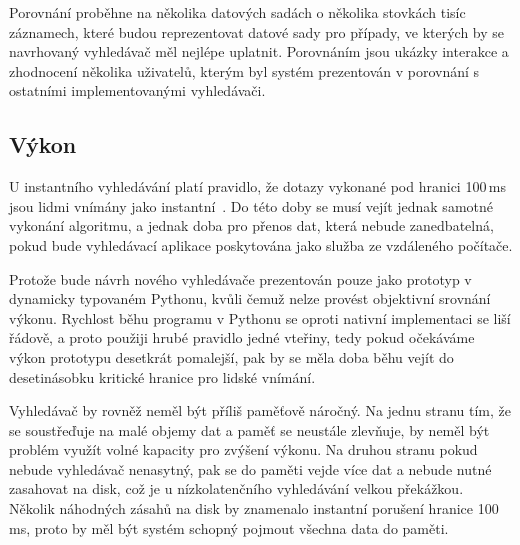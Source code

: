 \documentclass[11pt,letterpaper,oneside,openright]{book}
\begin{document}
Porovnání proběhne na několika datových sadách o několika stovkách tisíc
záznamech, které budou reprezentovat datové sady pro případy, ve kterých by se
navrhovaný vyhledávač měl nejlépe uplatnit. Porovnáním jsou ukázky interakce a
zhodnocení několika uživatelů, kterým byl systém prezentován v porovnání s
ostatními implementovanými vyhledávači.

\subsection{Výkon}
U instantního vyhledávání platí pravidlo, že dotazy vykonané pod hranici
100\,ms jsou lidmi vnímány jako instantní~\cite{sto_ms}. Do této doby se musí
vejít jednak samotné vykonání algoritmu, a jednak doba pro přenos dat, která
nebude zanedbatelná, pokud bude vyhledávací aplikace poskytována jako služba ze
vzdáleného počítače.

Protože bude návrh nového vyhledávače prezentován pouze jako prototyp v
dynamicky typovaném Pythonu, kvůli čemuž nelze provést objektivní srovnání
výkonu. Rychlost běhu programu v Pythonu se oproti nativní implementaci se liší
řádově, a proto použiji hrubé pravidlo jedné vteřiny, tedy pokud očekáváme
výkon prototypu desetkrát pomalejší, pak by se měla doba běhu vejít do
desetinásobku kritické hranice pro lidské vnímání.

Vyhledávač by rovněž neměl být příliš paměťově náročný. Na jednu stranu tím, že
se soustřeďuje na malé objemy dat a paměť se neustále zlevňuje, by neměl být
problém využít volné kapacity pro zvýšení výkonu. Na druhou stranu pokud nebude
vyhledávač nenasytný, pak se do paměti vejde více dat a nebude nutné zasahovat
na disk, což je u nízkolatenčního vyhledávání velkou překážkou. Několik
náhodných zásahů na disk by znamenalo instantní porušení hranice 100\,ms, proto
by měl být systém schopný pojmout všechna data do paměti.
\end{document}
